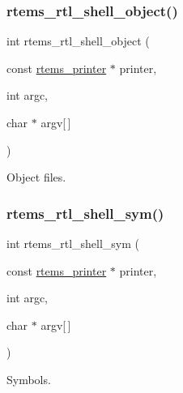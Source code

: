 \subsubsection{\texorpdfstring{rtems\_rtl\_shell\_object()}{rtems\_rtl\_shell\_object()}}
{\footnotesize\ttfamily int rtems\+\_\+rtl\+\_\+shell\+\_\+object (\begin{DoxyParamCaption}\item[{const \mbox{\hyperlink{structrtems__printer}{rtems\+\_\+printer}} $\ast$}]{printer,  }\item[{int}]{argc,  }\item[{char $\ast$}]{argv\mbox{[}$\,$\mbox{]} }\end{DoxyParamCaption})}

Object files. \mbox{\label{rtl-shell_8h_a50394981270941b025148ece371a0e5d}} 
\subsubsection{\texorpdfstring{rtems\_rtl\_shell\_sym()}{rtems\_rtl\_shell\_sym()}}
{\footnotesize\ttfamily int rtems\+\_\+rtl\+\_\+shell\+\_\+sym (\begin{DoxyParamCaption}\item[{const \mbox{\hyperlink{structrtems__printer}{rtems\+\_\+printer}} $\ast$}]{printer,  }\item[{int}]{argc,  }\item[{char $\ast$}]{argv\mbox{[}$\,$\mbox{]} }\end{DoxyParamCaption})}

Symbols. 